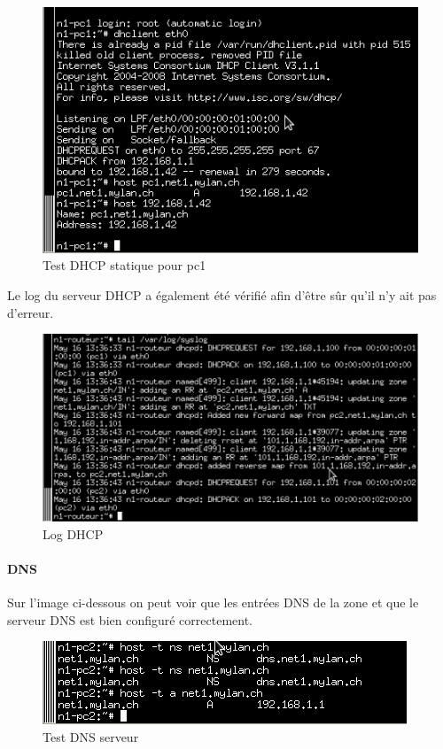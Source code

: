 \documentclass{article}
\begin{document}
\begin{figure}[!h]
	\centering
	\includegraphics{./captures/7-testfixadress.png}
	\caption{Test DHCP statique pour pc1}
	\label{fig:Test DHCP statique pour pc1}
\end{figure}

\clearpage


Le log du serveur DHCP a également été vérifié afin d'être sûr qu'il n'y ait pas d'erreur.

\begin{figure}[!h]
	\centering
	\includegraphics{./captures/2-log-dhcp.png}
	\caption{Log DHCP}
	\label{fig:Log DHCP}
\end{figure}

\paragraph{DNS}

Sur l'image ci-dessous on peut voir que les entrées DNS de la zone et que le serveur DNS est bien configuré correctement.

\begin{figure}[!h]
	\centering
	\includegraphics{./captures/1-testrouteur-dns1-pc2.png}
	\caption{Test DNS serveur}
	\label{fig:Test DNS serveur}
\end{figure}
\end{document}
